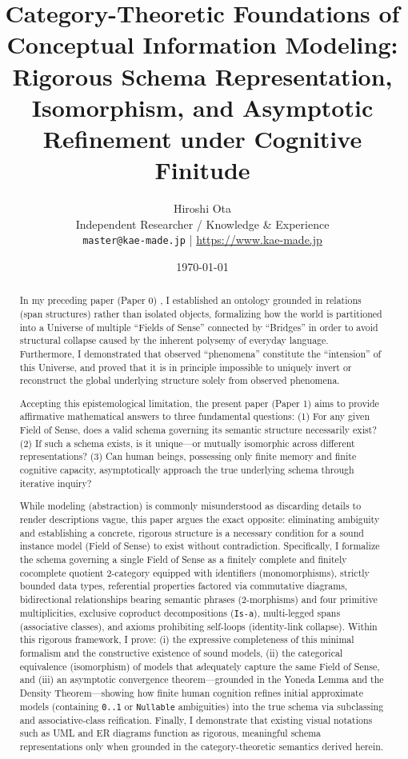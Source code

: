 \documentclass[11pt,a4paper]{article}
\title{\textbf{Category-Theoretic Foundations of Conceptual Information Modeling:\\
Rigorous Schema Representation, Isomorphism, and Asymptotic Refinement under Cognitive Finitude}}
\author{Hiroshi Ota\\
\small Independent Researcher / Knowledge \& Experience\\
\small \texttt{master@kae-made.jp} \quad | \quad \url{https://www.kae-made.jp}}
\date{\today}
\theoremstyle{definition}
\theoremstyle{plain}
\theoremstyle{remark}
\begin{document}
\maketitle

\begin{abstract}
In my preceding paper (Paper 0) \cite{ota2026paper0}, I established an ontology grounded in relations (span structures) rather than isolated objects, formalizing how the world is partitioned into a Universe of multiple ``Fields of Sense'' connected by ``Bridges'' in order to avoid structural collapse caused by the inherent polysemy of everyday language. Furthermore, I demonstrated that observed ``phenomena'' constitute the ``intension'' of this Universe, and proved that it is in principle impossible to uniquely invert or reconstruct the global underlying structure solely from observed phenomena.

Accepting this epistemological limitation, the present paper (Paper 1) aims to provide affirmative mathematical answers to three fundamental questions: (1) For any given Field of Sense, does a valid schema governing its semantic structure necessarily exist? (2) If such a schema exists, is it unique---or mutually isomorphic across different representations? (3) Can human beings, possessing only finite memory and finite cognitive capacity, asymptotically approach the true underlying schema through iterative inquiry?

While modeling (abstraction) is commonly misunderstood as discarding details to render descriptions vague, this paper argues the exact opposite: eliminating ambiguity and establishing a concrete, rigorous structure is a necessary condition for a sound instance model (Field of Sense) to exist without contradiction. Specifically, I formalize the schema governing a single Field of Sense as a finitely complete and finitely cocomplete quotient 2-category equipped with identifiers (monomorphisms), strictly bounded data types, referential properties factored via commutative diagrams, bidirectional relationships bearing semantic phrases (2-morphisms) and four primitive multiplicities, exclusive coproduct decompositions (\texttt{Is-a}), multi-legged spans (associative classes), and axioms prohibiting self-loops (identity-link collapse). Within this rigorous framework, I prove: (i) the expressive completeness of this minimal formalism and the constructive existence of sound models, (ii) the categorical equivalence (isomorphism) of models that adequately capture the same Field of Sense, and (iii) an asymptotic convergence theorem---grounded in the Yoneda Lemma and the Density Theorem---showing how finite human cognition refines initial approximate models (containing \texttt{0..1} or \texttt{Nullable} ambiguities) into the true schema via subclassing and associative-class reification. Finally, I demonstrate that existing visual notations such as UML and ER diagrams function as rigorous, meaningful schema representations only when grounded in the category-theoretic semantics derived herein.
\end{abstract}
\end{document}
